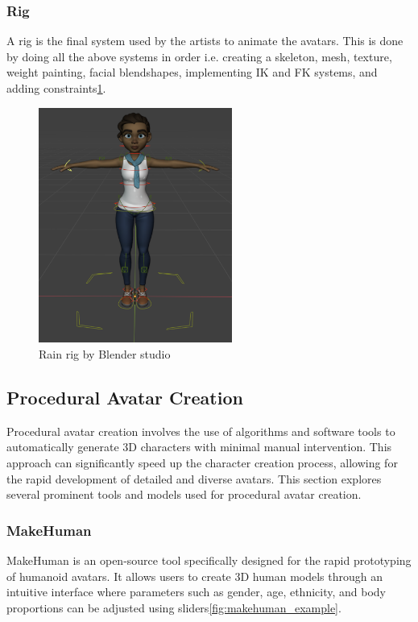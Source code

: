 \documentclass[../../main.tex]{subfiles}
\begin{document}
\subsubsection{Rig}

A rig is the final system used by the artists to animate the avatars. This is done by doing all the above systems in order i.e. creating a skeleton, mesh, texture, weight painting, facial blendshapes, implementing IK and FK systems, and adding constraints\ref{fig:rig_example}.

\begin{figure}
  \centering \includegraphics[width = 2.5in]{chapters/background_work/images/rig_example.png}
  \caption{Rain rig by Blender studio}
  \label{fig:rig_example}
\end{figure}

\subsection{Procedural Avatar Creation}

Procedural avatar creation involves the use of algorithms and software tools to automatically generate 3D characters with minimal manual intervention. This approach can significantly speed up the character creation process, allowing for the rapid development of detailed and diverse avatars. This section explores several prominent tools and models used for procedural avatar creation.

\subsubsection{MakeHuman}

MakeHuman is an open-source tool specifically designed for the rapid prototyping of humanoid avatars. It allows users to create 3D human models through an intuitive interface where parameters such as gender, age, ethnicity, and body proportions can be adjusted using sliders\ref{fig:makehuman_example}.
\end{document}
